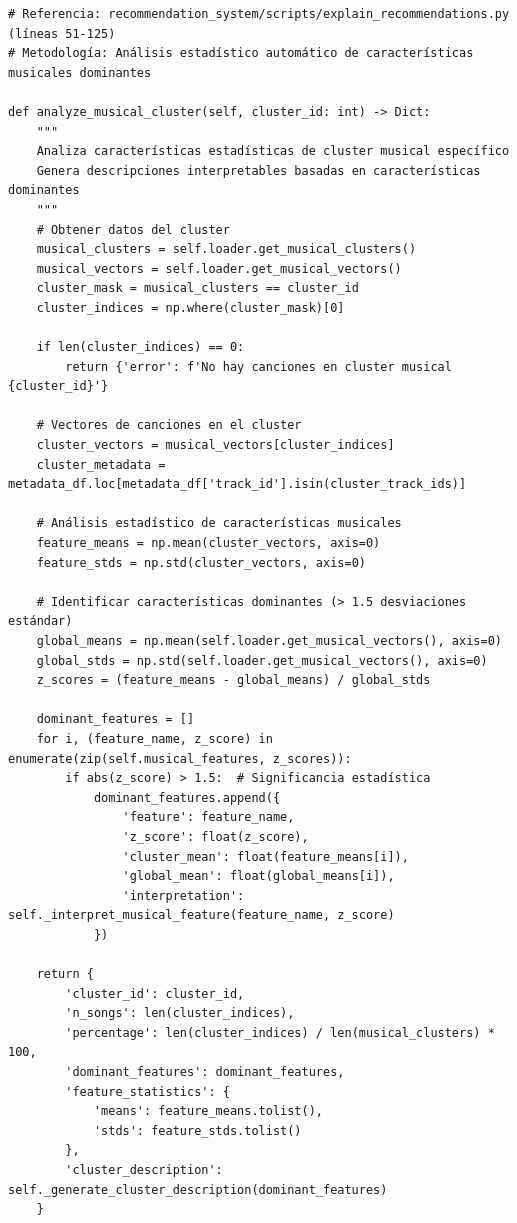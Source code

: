 \documentclass[12pt,a4paper]{report}
\begin{document}
\begin{lstlisting}[caption={Análisis Estadístico Automático de Clusters Musicales}]
# Referencia: recommendation_system/scripts/explain_recommendations.py (líneas 51-125)
# Metodología: Análisis estadístico automático de características musicales dominantes

def analyze_musical_cluster(self, cluster_id: int) -> Dict:
    """
    Analiza características estadísticas de cluster musical específico
    Genera descripciones interpretables basadas en características dominantes
    """
    # Obtener datos del cluster
    musical_clusters = self.loader.get_musical_clusters()
    musical_vectors = self.loader.get_musical_vectors()
    cluster_mask = musical_clusters == cluster_id
    cluster_indices = np.where(cluster_mask)[0]

    if len(cluster_indices) == 0:
        return {'error': f'No hay canciones en cluster musical {cluster_id}'}

    # Vectores de canciones en el cluster
    cluster_vectors = musical_vectors[cluster_indices]
    cluster_metadata = metadata_df.loc[metadata_df['track_id'].isin(cluster_track_ids)]

    # Análisis estadístico de características musicales
    feature_means = np.mean(cluster_vectors, axis=0)
    feature_stds = np.std(cluster_vectors, axis=0)

    # Identificar características dominantes (> 1.5 desviaciones estándar)
    global_means = np.mean(self.loader.get_musical_vectors(), axis=0)
    global_stds = np.std(self.loader.get_musical_vectors(), axis=0)
    z_scores = (feature_means - global_means) / global_stds

    dominant_features = []
    for i, (feature_name, z_score) in enumerate(zip(self.musical_features, z_scores)):
        if abs(z_score) > 1.5:  # Significancia estadística
            dominant_features.append({
                'feature': feature_name,
                'z_score': float(z_score),
                'cluster_mean': float(feature_means[i]),
                'global_mean': float(global_means[i]),
                'interpretation': self._interpret_musical_feature(feature_name, z_score)
            })

    return {
        'cluster_id': cluster_id,
        'n_songs': len(cluster_indices),
        'percentage': len(cluster_indices) / len(musical_clusters) * 100,
        'dominant_features': dominant_features,
        'feature_statistics': {
            'means': feature_means.tolist(),
            'stds': feature_stds.tolist()
        },
        'cluster_description': self._generate_cluster_description(dominant_features)
    }
\end{lstlisting}
\end{document}
